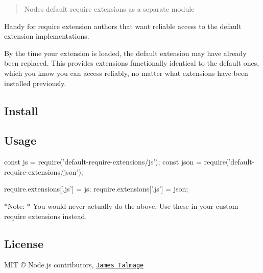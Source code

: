 \begin{quote}
Node\textquotesingle{}s default require extensions as a separate module \end{quote}


Handy for require extension authors that want reliable access to the default extension implementations.

By the time your extension is loaded, the default extension may have already been replaced. This provides extensions functionally identical to the default ones, which you know you can access reliably, no matter what extensions have been installed previously.

\subsection*{Install}




\subsection*{Usage}


\begin{DoxyCode}
const js = require('default-require-extensions/js');
const json = require('default-require-extensions/json');

require.extensions['.js'] = js;
require.extensions['.js'] = json;
\end{DoxyCode}


$\ast$\+Note\+: $\ast$ You would never actually do the above. Use these in your custom require extensions instead. ~\newline


\subsection*{License}

M\+IT © Node.\+js contributors, \href{http://github.com/jamestalmage}{\tt James Talmage} 
